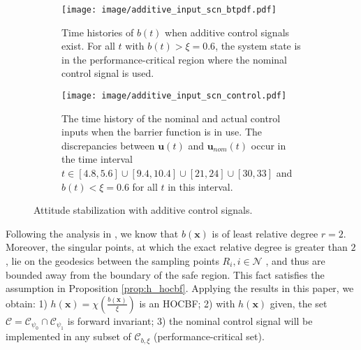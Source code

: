 \documentclass[letterpaper, 10 pt, journal, twoside]{IEEEtran}
\theoremstyle{plain}
\newcommand{\myvar}[1]{\bm{#1}}
\newcommand{\myset}[1]{\mathscr{#1}}
\begin{document}
\begin{figure}[!h]
    \centering
    \begin{subfigure}[t]{\linewidth}
    \texttt{[image: image/additive\_input\_scn\_btpdf.pdf]}
    \caption{Time histories of $b(t)$ when additive control signals exist. For all $t$ with $b(t)>\xi = 0.6$, the system state is in the performance-critical region where the nominal control signal is used.}
    \end{subfigure}
    \begin{subfigure}[t]{\linewidth}
    \texttt{[image: image/additive\_input\_scn\_control.pdf]}
    \caption{The time history of the nominal and actual control inputs when the barrier function is in use. The discrepancies between $\myvar{u}(t)$ and $\myvar{u}_{nom}(t)$ occur in the time interval $t\in[4.8, 5.6]\cup[9.4,10.4]\cup[21,24]\cup[30,33]$ and $b(t) < \xi = 0.6$ for all $t$ in this interval.}
    \end{subfigure}
    \caption{Attitude stabilization with additive control signals.}
    \label{fig:additive_control_scn}
\end{figure}


Following the analysis in \cite{tan2020construction}, we know that $b(\myvar{x})$ is of least relative degree $r = 2$. Moreover, the singular points, at which the exact relative degree is greater than $2$, lie on the geodesics between the sampling points $R_i, i \in \mathcal{N}$ \cite[Proposition~3]{tan2020construction}, {and} thus are bounded away from the boundary of the safe region. This fact satisfies the assumption in Proposition \ref{prop:h_hocbf}. Applying the results in this paper, we obtain: 1) $ h(\myvar{x}) =  \chi\left(\tfrac{b(\myvar{x})}{\xi} \right)$
is an HOCBF; 2) with $h(\myvar{x})$ given, the set $\myset{C} = \myset{C}_{\psi_0} \cap \myset{C}_{\psi_1}$ is forward invariant; 3)  the nominal control signal will be implemented  in any subset of $\myset{C}_{b,\xi}$ (performance-critical set).
\end{document}
